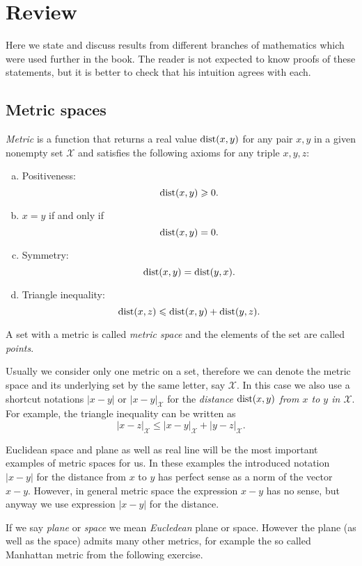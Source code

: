 \chapter{Review}

Here we state and discuss results from different branches of mathematics which were used further in the book.
The reader is not expected to know proofs of these statements, but it is better to check that his intuition agrees with each.  

\section{Metric spaces}

\emph{Metric} is a function that returns a real value $\mathop{\rm dist}\nolimits(x,y)$ for any pair $x,y$ in a given nonempty set $\mathcal X$  and satisfies the following axioms for any triple $x,y,z$:
\begin{enumerate}[(a)]
\item\label{def:metric-space:a} Positiveness: 
$$\mathop{\rm dist}\nolimits(x,y)\geqslant 0.$$
\item\label{def:metric-space:b} $x=y$ if and only if 
$$\mathop{\rm dist}\nolimits(x,y)=0.$$
\item\label{def:metric-space:c} Symmetry: $$\mathop{\rm dist}\nolimits(x, y) = \mathop{\rm dist}\nolimits(y, x).$$
\item\label{def:metric-space:d} Triangle inequality: 
$$\mathop{\rm dist}\nolimits(x, z) \leqslant \mathop{\rm dist}\nolimits(x, y) + \mathop{\rm dist}\nolimits(y, z).$$
\end{enumerate}

A set with a metric is called \emph{metric space} and the elements of the set are called \emph{points}.

Usually we consider only one metric on a set, therefore we can denote the metric space and its underlying set by the same letter, say $\mathcal X$.
In this case we also use a shortcut notations $|x-y|$ or  $|x-y|_\mathcal X$ for the \emph{distance $\mathop{\rm dist}\nolimits(x,y)$ from $x$ to $y$ in $\mathcal X$}.
For example, the triangle inequality can be written as 
$$|x-z|_{\mathcal X}\le |x-y|_{\mathcal X}+|y-z|_{\mathcal X}.$$

Euclidean space and plane as well as real line will be the most important examples of metric spaces for us.
In these examples the introduced notation $|x-y|$ for the distance from $x$ to $y$ has perfect sense as a norm of the vector $x-y$.
However, in general metric space the expression $x-y$ has no sense, but anyway we use expression $|x-y|$ for the distance.

If we say \emph{plane} or \emph{space} we mean \emph{Eucledean} plane or space.
However the plane (as well as the space) admits many other metrics, for example the so called Manhattan metric from the following exercise.

